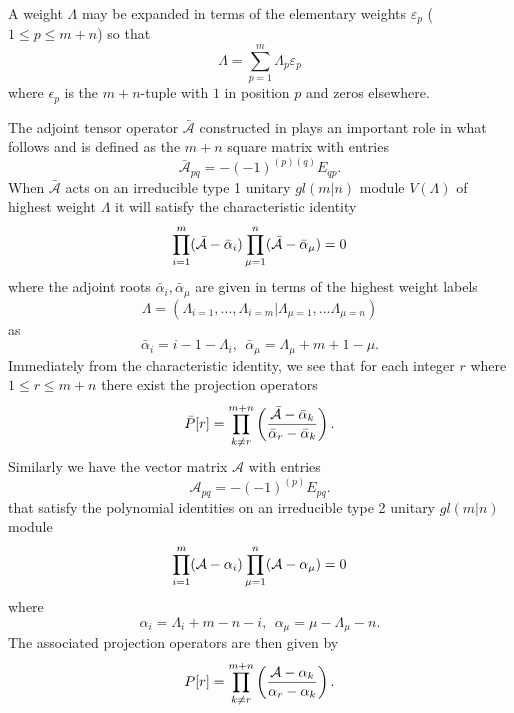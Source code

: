 \documentclass[12pt]{article}
\begin{document}
A weight $\Lambda$ may be expanded in terms
of the elementary weights $\varepsilon_p$ ($1\leq p\leq m+n$) so that
\begin{equation*}
\Lambda = \sum_{p=1}^m\Lambda_p\varepsilon_p 
\end{equation*}
where $\epsilon_p$ is the $m+n$-tuple with $1$ in position $p$ and zeros elsewhere.

The adjoint tensor operator $\bar{\mathcal{A}}$ constructed in \cite{GIW1} plays an important role in what follows and is defined as the $m+n$ square matrix with entries
$$
\bar{\mathcal{A}}_{pq} = -(-1)^{(p)(q)} E_{qp}.
$$
When $\bar{\mathcal{A}}$ acts on an irreducible type 1 unitary $gl(m|n)$ module $V(\Lambda)$ of highest weight $\Lambda$ it will satisfy the characteristic identity
\begin{align}
\prod_{i=1}^m ({\cal \bar{A}} - \bar{\alpha}_i) \prod^n_{\mu = 1} ({\cal \bar{A}} - \bar{\alpha}_\mu) = 0
\label{CharIdent1}
\end{align}
where the adjoint roots $\bar{\alpha}_i, \bar{\alpha}_\mu$ are given in terms of the highest weight labels
$$
\Lambda = (\Lambda_{i=1},...,\Lambda_{i=m}|\Lambda_{\mu=1},...\Lambda_{\mu=n})
$$
as
$$
{\bar{\alpha}}_i= i - 1 -\Lambda_i ,~~ {\bar{\alpha}}_\mu = \Lambda_\mu + m + 1 - \mu. 
$$
Immediately from the characteristic identity, we see that for each integer $r$ where $1 \leq  r \leq m+n$ there exist the projection operators 
\begin{align}
\label{proj_bar}
\bar{P}[r] = \prod^{m+n}_{k \neq r} \left( \frac{{\cal \bar{A}} - \bar{\alpha}_k}{\bar{\alpha}_r
- \bar{\alpha}_k} \right).
\end{align}
Similarly we have the vector matrix $\mathcal{A}$ with entries
$$
\mathcal{A}_{pq} = -(-1)^{(p)} E_{pq}.
$$
that satisfy the polynomial identities on an irreducible type 2 unitary $gl(m|n)$ module
\begin{align}
\prod_{i=1}^m ({\cal A} - \alpha_i) \prod^n_{\mu = 1} ({\cal A} - \alpha_\mu) = 0
\label{CharIdent2}
\end{align}
where
$$
{\alpha}_i= \Lambda_i + m - n - i ,~~ {\alpha}_\mu = \mu - \Lambda_\mu -n. 
$$
The associated projection operators 
are then given by
\begin{align}
P[r] = \prod^{m+n}_{k \neq r} \left( \frac{{\cal A} - \alpha_k}{\alpha_r
- \alpha_k} \right).
\label{proj_unbar}
\end{align}
\end{document}
